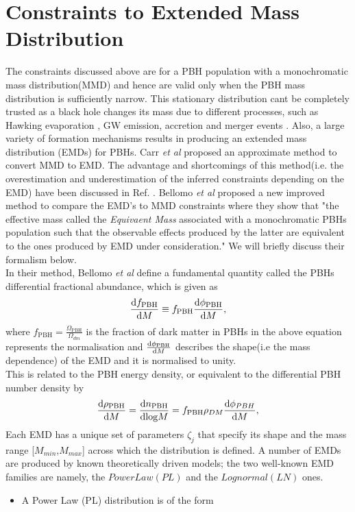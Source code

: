 \section{Constraints to Extended Mass Distribution} \label{emd}

The constraints discussed above are for a PBH population with a monochromatic mass distribution(MMD) and hence are valid only when the PBH mass distribution is sufficiently narrow. This stationary distribution cant be completely trusted as a black hole changes its mass due to different processes, such as Hawking evaporation \cite{1974Natur.248...30H}, GW emission, accretion \cite{Ali-Haimoud:2016mbv} and merger events \cite{2016PhRvL.116t1301B}. Also, a large variety of formation mechanisms results in producing an extended mass distribution (EMDs) for PBHs. Carr \emph{et al}\cite{Carr:2017jsz} proposed an approximate method to convert MMD to EMD. The advantage and shortcomings of this method(i.e. the overestimation and underestimation of the inferred constraints  depending on the EMD) have been discussed in Ref. \cite{Green:2016xgy}. Bellomo \emph{et al} \cite{Bellomo:2017zsr} proposed a new improved method to compare the EMD's to MMD constraints where they show that "the effective mass called the \emph{Equivaent Mass} associated with a monochromatic PBHs population such that the observable effects produced by the latter are equivalent to the ones produced by EMD under consideration." We will briefly discuss their formalism below.\\

In their method, Bellomo \emph{et al} \cite{Bellomo:2017zsr} define a fundamental quantity called the PBHs differential fractional abundance, which is given as
\begin{align}
    \dv{f_{\mathrm{PBH}}}{M} \equiv f_{\mathrm{PBH}} \dv{\phi_{\mathrm{PBH}}}{M}, \label{4.10}
\end{align}
where $f_{\mathrm{PBH}} = \frac{\Omega_{\mathrm{PBH}}}{\Omega_{dm}}$ is the fraction of dark matter in PBHs in the above equation represents the normalisation and $\dv{\phi_{\mathrm{PBH}}}{M}$ describes the shape(i.e the mass dependence) of the EMD and it is normalised to unity.\\
This is related to the PBH energy density, or equivalent to the differential PBH number density by
\begin{align}
    \dv{\rho_{\mathrm{PBH}}}{M} = \dv{n_{\mathrm{PBH}}}{\mathrm{log}M} = f_{\mathrm{PBH}}\rho_{DM}\dv{\phi_{PBH}}{M}, \label{4.11}
\end{align}
Each EMD has a unique set of parameters $ \zeta_{j}$ that specify its shape and the mass range [$M_{min}$,$ M_{max}$] across which the distribution is defined. A number of EMDs are produced by known theoretically driven models; the two well-known EMD families are namely, the $Power Law (PL)$ and the $Lognormal (LN)$ ones.
\begin{itemize}
  \item A Power Law (PL) distribution is of the form
\end{itemize}

